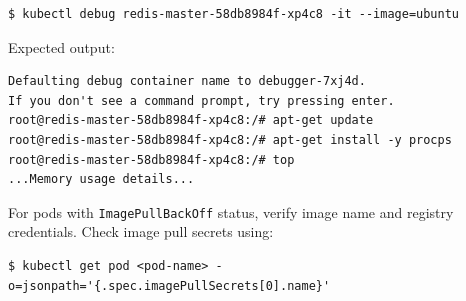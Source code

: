 \documentclass{article}
\begin{document}
\begin{lstlisting}[style=bash]
$ kubectl debug redis-master-58db8984f-xp4c8 -it --image=ubuntu
\end{lstlisting}

Expected output:

\begin{lstlisting}[style=bash]
Defaulting debug container name to debugger-7xj4d.
If you don't see a command prompt, try pressing enter.
root@redis-master-58db8984f-xp4c8:/# apt-get update
root@redis-master-58db8984f-xp4c8:/# apt-get install -y procps
root@redis-master-58db8984f-xp4c8:/# top
...Memory usage details...
\end{lstlisting}

\begin{tcolorbox}[colback=green!5!white,colframe=green!75!black,title=Tip]
For pods with \texttt{ImagePullBackOff} status, verify image name and registry credentials. Check image pull secrets using:

\begin{lstlisting}[style=bash]
$ kubectl get pod <pod-name> -o=jsonpath='{.spec.imagePullSecrets[0].name}'
\end{lstlisting}
\end{tcolorbox}
\end{document}
